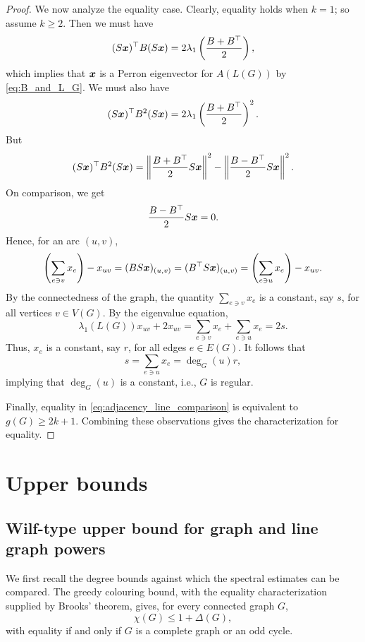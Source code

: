 \documentclass[10pt,a4paper]{article}
\theoremstyle{plain}
\numberwithin{equation}{section}
\def\x{\mbox{\boldmath $x$}}
\begin{document}
\begin{proof}
We now analyze the equality case. Clearly, equality holds when $k=1$; so assume $k\ge 2$. Then we must have
\[ (S\x)^\top B (S\x) = 2 \lambda_1\left(\frac{B+B^\top}{2}\right),\]
which implies that $\x$ is a Perron eigenvector for $A(L(G))$ by \eqref{eq:B_and_L_G}. We must also have
\[ (S\x)^\top B^2 (S\x) = 2 \lambda_1\left(\frac{B+B^\top}{2}\right)^2. \]
But 
\[(S\x)^\top B^2 (S\x) = \left\|\frac{B+B^\top}{2}S\x\right\|^2 - \left\|\frac{B-B^\top}{2}S\x \right\|^2.\]
On comparison, we get 
\[ \frac{B-B^\top}{2}S\x  = 0.\]
Hence, for an arc $(u,v)$, 
\[\left(\sum_{ e\ni v} x_e \right) - x_{uv} = (BS\x)_{(u,v)} = (B^\top S\x)_{(u,v)} = \left(\sum_{ e\ni u} x_e \right) - x_{uv}.\]
By the connectedness of the graph, the quantity $\sum_{ e\ni v} x_e$ is a constant, say $s$, for all vertices $v\in V(G)$. By the eigenvalue equation, 
\[\lambda_1(L(G))x_{uv} + 2x_{uv} = \sum_{ e\ni v}x_e + \sum_{ e\ni u}x_e =2s.\]
Thus, $x_{e}$ is a constant, say $r$, for all edges $e\in E(G)$. It follows that 
\[s = \sum_{e\ni u} x_e = \deg_G(u)r,\]
implying that $\deg_G(u)$ is a constant, i.e., $G$ is regular. 

Finally, equality in \eqref{eq:adjacency_line_comparison} is equivalent to $g(G)\ge 2k+1$. Combining these observations gives the characterization for equality. 
\end{proof}

\section{Upper bounds} \label{sec:wilfspectrarelated}


\subsection{Wilf-type upper bound for graph and line graph powers}

We first recall the degree bounds against which the spectral estimates can be compared. The greedy colouring bound, with the equality characterization supplied by Brooks' theorem, gives, for every connected graph $G$,
\begin{equation}\label{eq:Brooks}
  \chi(G)\le 1 + \Delta(G), 
\end{equation}
with equality if and only if $G$ is a complete graph or an odd cycle.
\end{document}
